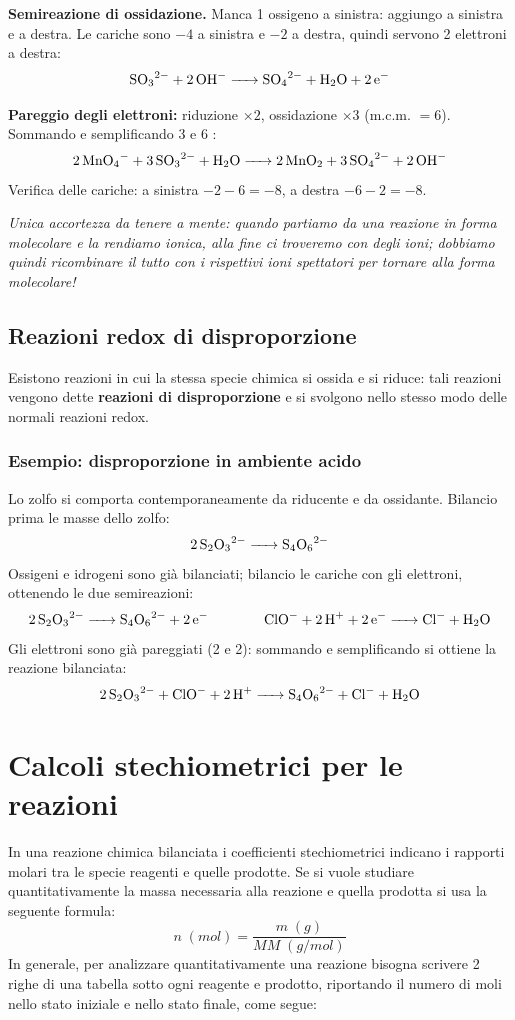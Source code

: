 \documentclass[11pt, a4paper, openright]{book}
\begin{document}
\textbf{Semireazione di ossidazione.} Manca 1 ossigeno a sinistra: aggiungo  a sinistra e  a destra. Le cariche sono $-4$ a sinistra e $-2$ a destra, quindi servono 2 elettroni a destra:
\[
\ce{SO3^2- + 2OH^- -> SO4^2- + H2O + 2e^-}
\]

\textbf{Pareggio degli elettroni:} riduzione $\times 2$, ossidazione $\times 3$ (m.c.m. $= 6$). Sommando e semplificando 3  e 6 :
\[
\mathbf{\ce{2MnO4^- + 3SO3^2- + H2O -> 2MnO2 + 3SO4^2- + 2OH^-}}
\]
Verifica delle cariche: a sinistra $-2 - 6 = -8$, a destra $-6 - 2 = -8$.

\medskip
\textit{Unica accortezza da tenere a mente: quando partiamo da una reazione in forma molecolare e la rendiamo ionica, alla fine ci troveremo con degli ioni; dobbiamo quindi ricombinare il tutto con i rispettivi ioni spettatori per tornare alla forma molecolare!}



\subsection{Reazioni redox di disproporzione}
Esistono reazioni in cui la stessa specie chimica si ossida e si riduce: tali reazioni vengono dette \textbf{reazioni di disproporzione} e si svolgono nello stesso modo delle normali reazioni redox.



\subsubsection*{Esempio: disproporzione in ambiente acido}
\begin{center}
\end{center}
Lo zolfo si comporta contemporaneamente da riducente e da ossidante. Bilancio prima le masse dello zolfo:
\[
\ce{2S2O3^2- -> S4O6^2-}
\]
Ossigeni e idrogeni sono già bilanciati; bilancio le cariche con gli elettroni, ottenendo le due semireazioni:
\[
\ce{2S2O3^2- -> S4O6^2- + 2e^-}
\qquad\qquad
\ce{ClO^- + 2H^+ + 2e^- -> Cl^- + H2O}
\]
Gli elettroni sono già pareggiati (2 e 2): sommando e semplificando si ottiene la reazione bilanciata:
\[
\mathbf{\ce{2S2O3^2- + ClO^- + 2H^+ -> S4O6^2- + Cl^- + H2O}}
\]


\newpage

\section{Calcoli stechiometrici per le reazioni}
In una reazione chimica bilanciata i coefficienti stechiometrici indicano i rapporti molari tra le specie reagenti e quelle prodotte. Se si vuole studiare quantitativamente la massa necessaria alla reazione e quella prodotta si usa la seguente formula:
\begin{equation}
    n \; (mol) = \frac{m \; (g)}{MM \; (g/mol)}
\end{equation}
In generale, per analizzare quantitativamente una reazione bisogna scrivere 2 righe di una tabella sotto ogni reagente e prodotto, riportando il numero di moli nello stato iniziale e nello stato finale, come segue:
\end{document}
